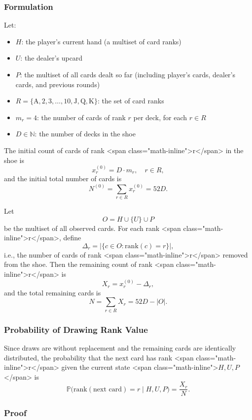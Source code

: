 \documentclass[12pt,a4paper]{cibb}
\begin{document}
\subsubsection{Formulation}

Let:
\begin{itemize}
  \item $H$: the player's current hand (a multiset of card ranks)
  \item $U$: the dealer's upcard
  \item $P$: the multiset of all cards dealt so far (including player's cards, dealer's cards, and previous rounds)
  \item $R = \{\mathrm{A}, 2, 3, \dots, 10, \mathrm{J}, \mathrm{Q}, \mathrm{K}\}$: the set of card ranks
  \item $m_r = 4$: the number of cards of rank $r$ per deck, for each $r \in R$
  \item $D \in \mathbb{N}$: the number of decks in the shoe
\end{itemize}

The initial count of cards of rank <span class="math-inline">r</span> in the shoe is
\[
  x_r^{(0)} = D \cdot m_r, \quad r\in R,
\]
and the initial total number of cards is
\[
  N^{(0)} = \sum_{r\in R} x_r^{(0)} = 52D.
\]

Let
\[
  O = H \cup \{U\} \cup P
\]
be the multiset of all observed cards. 
For each rank <span class="math-inline">r</span>, define
\[
  \Delta_r = \bigl|\{c \in O : \mathrm{rank}(c)=r\}\bigr|,
\]
i.e., the number of cards of rank <span class="math-inline">r</span> removed from the shoe.
Then the remaining count of rank <span class="math-inline">r</span> is
\[
  X_r = x_r^{(0)} - \Delta_r,
\]
and the total remaining cards is
\[
  N = \sum_{r\in R} X_r = 52D - |O|.
\]

\subsubsection{Probability of Drawing Rank Value}

Since draws are without replacement and the remaining cards are identically distributed, the probability that the next card has rank <span class="math-inline">r</span> given the current state <span class="math-inline">\(H,U,P\)</span> is
\[
  \mathbb{P}\bigl(\mathrm{rank}(\text{next card}) = r \mid H, U, P\bigr)
  = \frac{X_r}{N}.
\]

\subsubsection{Proof}
\end{document}
